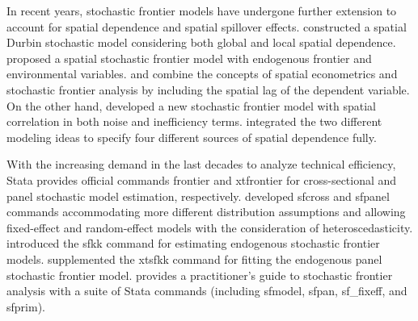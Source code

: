 In recent years, stochastic frontier models have undergone further extension to account for spatial dependence and spatial spillover effects. \cite{glass2016spatial} constructed a spatial Durbin stochastic model considering both global and local spatial dependence. \cite{kutluSpatialStochasticFrontier2020} proposed a spatial stochastic frontier model with endogenous frontier and environmental variables. \cite{glass2016spatial} and \cite{kutluSpatialStochasticFrontier2020} combine the concepts of spatial econometrics and stochastic frontier analysis by including the spatial lag of the dependent variable. On the other hand, \cite{orea2019new} developed a new stochastic frontier model with spatial correlation in both noise and inefficiency terms. \cite{galli2022spatial} integrated the two different modeling ideas to specify four different sources of spatial dependence fully.  


With the increasing demand in the last decades to analyze technical efficiency, Stata provides official commands frontier and xtfrontier for cross-sectional and panel stochastic model estimation, respectively. \cite{belotti2013stochastic} developed sfcross and sfpanel commands accommodating more different distribution assumptions and allowing fixed-effect and random-effect models with the consideration of heteroscedasticity. \cite{karakaplan2017fitting} introduced the sfkk command for estimating endogenous stochastic frontier models. \cite{mustafaugurkarakaplan2018xtsfkk} supplemented the xtsfkk command for fitting the endogenous panel stochastic frontier model. \cite{kumbhakarpractitioner} provides a practitioner’s guide to stochastic frontier analysis with a suite of Stata commands (including sfmodel, sfpan, sf\_fixeff, and sfprim).

